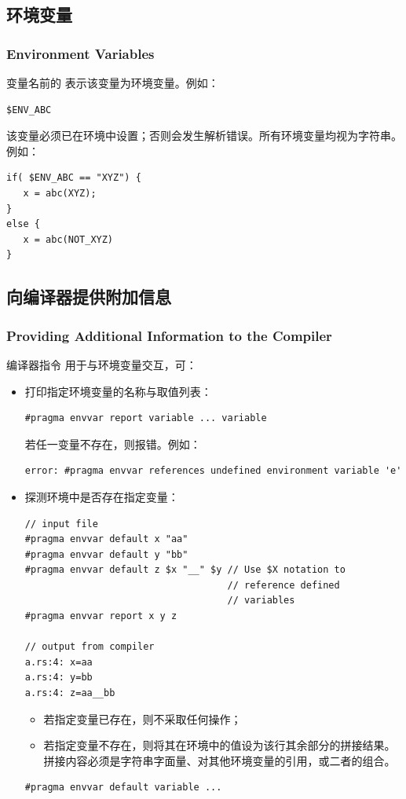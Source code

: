\subsection{环境变量}
\subsubsection*{Environment Variables}

变量名前的 \cmd{\$} 表示该变量为环境变量。例如：
\begin{lstlisting}[style=pxl]
$ENV_ABC
\end{lstlisting}

该变量必须已在环境中设置；否则会发生解析错误。所有环境变量均视为字符串。例如：
\begin{lstlisting}[style=pxl]
if( $ENV_ABC == "XYZ") {
   x = abc(XYZ);
}
else {
   x = abc(NOT_XYZ)
}
\end{lstlisting}

\subsection{向编译器提供附加信息}
\subsubsection*{Providing Additional Information to the Compiler}

编译器指令  用于与环境变量交互，可：
\begin{itemize}
  \item 打印指定环境变量的名称与取值列表：
\begin{lstlisting}[style=pxl]
#pragma envvar report variable ... variable
\end{lstlisting}
  若任一变量不存在，则报错。例如：
\begin{lstlisting}
error: #pragma envvar references undefined environment variable 'e'
\end{lstlisting}

  \item 探测环境中是否存在指定变量：
\begin{lstlisting}[style=pxl]
// input file
#pragma envvar default x "aa"
#pragma envvar default y "bb"
#pragma envvar default z $x "__" $y // Use $X notation to
                                    // reference defined
                                    // variables
#pragma envvar report x y z

// output from compiler
a.rs:4: x=aa
a.rs:4: y=bb
a.rs:4: z=aa__bb
\end{lstlisting}
  \begin{itemize}
    \item 若指定变量已存在，则不采取任何操作；
    \item 若指定变量不存在，则将其在环境中的值设为该行其余部分的拼接结果。拼接内容必须是字符串字面量、对其他环境变量的引用，或二者的组合。
  \end{itemize}
\begin{lstlisting}[style=pxl]
#pragma envvar default variable ...
\end{lstlisting}
\end{itemize}

